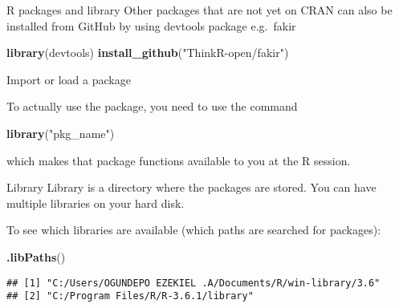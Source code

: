 \documentclass[
  ignorenonframetext,
]{beamer}
\newenvironment{Shaded}{\begin{snugshade}}{\end{snugshade}}
\newcommand{\KeywordTok}[1]{\textcolor[rgb]{0.13,0.29,0.53}{\textbf{#1}}}
\newcommand{\NormalTok}[1]{#1}
\newcommand{\StringTok}[1]{\textcolor[rgb]{0.31,0.60,0.02}{#1}}
\begin{document}
\begin{frame}[fragile]{R packages and library}
\protect\hypertarget{r-packages-and-library-1}{}
\pause
Other packages that are not yet on CRAN can also be installed from
GitHub by using devtools package e.g.~fakir \pause

\begin{Shaded}
\begin{Highlighting}[]
\KeywordTok{library}\NormalTok{(devtools)}
\KeywordTok{install_github}\NormalTok{(}\StringTok{"ThinkR-open/fakir"}\NormalTok{)}
\end{Highlighting}
\end{Shaded}

\end{frame}

\begin{frame}[fragile]{Import or load a package}
\protect\hypertarget{import-or-load-a-package}{}

\pause
To actually use the package, you need to use the command
\pause
\begin{Shaded}
\begin{Highlighting}[]
\KeywordTok{library}\NormalTok{(}\StringTok{"pkg_name"}\NormalTok{)}
\end{Highlighting}
\end{Shaded}
\pause
which makes that package functions available to you at the R session.

\end{frame}

\begin{frame}[fragile]{Library}
\protect\hypertarget{library}{}
\pause
Library is a directory where the packages are stored. You can have
multiple libraries on your hard disk. \pause

To see which libraries are available (which paths are searched for
packages): \pause

\begin{Shaded}
\begin{Highlighting}[]
\KeywordTok{.libPaths}\NormalTok{()}
\end{Highlighting}
\end{Shaded}

\begin{verbatim}
## [1] "C:/Users/OGUNDEPO EZEKIEL .A/Documents/R/win-library/3.6"
## [2] "C:/Program Files/R/R-3.6.1/library"
\end{verbatim}

\end{frame}
\end{document}
